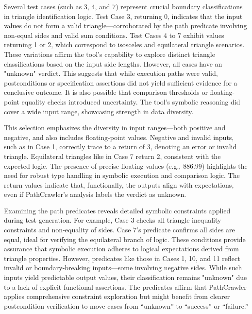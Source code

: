 \documentclass[12pt]{article}
\begin{document}
Several test cases (such as 3, 4, and 7) represent crucial boundary classifications in triangle identification logic. Test Case 3, returning 0, indicates that the input values do not form a valid triangle—corroborated by the path predicate involving non-equal sides and valid sum conditions. Test Cases 4 to 7 exhibit values returning 1 or 2, which correspond to isosceles and equilateral triangle scenarios. These variations affirm the tool’s capability to explore distinct triangle classifications based on the input side lengths. However, all cases have an "unknown" verdict. This suggests that while execution paths were valid, postconditions or specification assertions did not yield sufficient evidence for a conclusive outcome. It is also possible that comparison thresholds or floating-point equality checks introduced uncertainty. The tool's symbolic reasoning did cover a wide input range, showcasing strength in data diversity.

This selection emphasizes the diversity in input ranges—both positive and negative, and also includes floating-point values. Negative and invalid inputs, such as in Case 1, correctly trace to a return of 3, denoting an error or invalid triangle. Equilateral triangles like in Case 7 return 2, consistent with the expected logic. The presence of precise floating values (e.g., 886.99) highlights the need for robust type handling in symbolic execution and comparison logic. The return values indicate that, functionally, the outputs align with expectations, even if PathCrawler’s analysis labels the verdict as unknown.

Examining the path predicates reveals detailed symbolic constraints applied during test generation. For example, Case 3 checks all triangle inequality constraints and non-equality of sides. Case 7's predicate confirms all sides are equal, ideal for verifying the equilateral branch of logic. These conditions provide assurance that symbolic execution adheres to logical expectations derived from triangle properties. However, predicates like those in Cases 1, 10, and 11 reflect invalid or boundary-breaking inputs—some involving negative sides. While such inputs yield predictable output values, their classification remains "unknown" due to a lack of explicit functional assertions. The predicates affirm that PathCrawler applies comprehensive constraint exploration but might benefit from clearer postcondition verification to move cases from “unknown” to “success” or “failure.”
\end{document}
